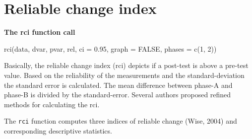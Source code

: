 \documentclass[
  letterpaper,
  DIV=11,
  numbers=noendperiod]{scrreprt}
\newenvironment{Shaded}{\begin{snugshade}}{\end{snugshade}}
\newcommand{\AttributeTok}[1]{\textcolor[rgb]{0.40,0.45,0.13}{#1}}
\newcommand{\ConstantTok}[1]{\textcolor[rgb]{0.56,0.35,0.01}{#1}}
\newcommand{\FloatTok}[1]{\textcolor[rgb]{0.68,0.00,0.00}{#1}}
\newcommand{\FunctionTok}[1]{\textcolor[rgb]{0.28,0.35,0.67}{#1}}
\newcommand{\NormalTok}[1]{\textcolor[rgb]{0.00,0.23,0.31}{#1}}
\newcommand{\SpecialCharTok}[1]{\textcolor[rgb]{0.37,0.37,0.37}{#1}}
\begin{document}
\hypertarget{reliable-change-index}{%
\section{Reliable change index}\label{reliable-change-index}}

\begin{tcolorbox}[enhanced jigsaw, breakable, rightrule=.15mm, bottomrule=.15mm, arc=.35mm, colback=white, colframe=quarto-callout-tip-color-frame, opacityback=0, leftrule=.75mm, toprule=.15mm, left=2mm]
\begin{minipage}[t]{5.5mm}
\textcolor{quarto-callout-tip-color}{\faLightbulb}
\end{minipage}%
\begin{minipage}[t]{\textwidth - 5.5mm}

\textbf{The rci function call}\vspace{2mm}

rci(data, dvar, pvar, rel, ci = 0.95, graph = FALSE, phases = c(1, 2))

\end{minipage}%
\end{tcolorbox}

Basically, the reliable change index (rci) depicts if a post-test is
above a pre-test value. Based on the reliability of the measurements and
the standard-deviation the standard error is calculated. The mean
difference between phase-A and phase-B is divided by the standard-error.
Several authors proposed refined methods for calculating the rci.

The \texttt{rci} function computes three indices of reliable change
(Wise, 2004) and corresponding descriptive statistics.

\begin{Shaded}
\end{Shaded}
\end{document}
